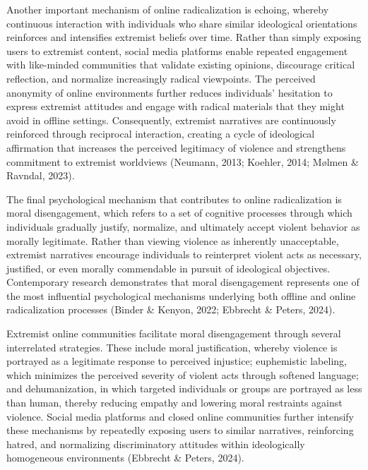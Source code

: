 \documentclass{NSP1}
\begin{document}
\par\medskip{}\smallskip

Another important mechanism of online radicalization is echoing, whereby continuous interaction with individuals who share similar ideological orientations reinforces and intensifies extremist beliefs over time. Rather than simply exposing users to extremist content, social media platforms enable repeated engagement with like-minded communities that validate existing opinions, discourage critical reflection, and normalize increasingly radical viewpoints. The perceived anonymity of online environments further reduces individuals' hesitation to express extremist attitudes and engage with radical materials that they might avoid in offline settings. Consequently, extremist narratives are continuously reinforced through reciprocal interaction, creating a cycle of ideological affirmation that increases the perceived legitimacy of violence and strengthens commitment to extremist worldviews (Neumann, 2013; Koehler, 2014; Mølmen \& Ravndal, 2023).

\par\medskip{}\smallskip

The final psychological mechanism that contributes to online radicalization is moral disengagement, which refers to a set of cognitive processes through which individuals gradually justify, normalize, and ultimately accept violent behavior as morally legitimate. Rather than viewing violence as inherently unacceptable, extremist narratives encourage individuals to reinterpret violent acts as necessary, justified, or even morally commendable in pursuit of ideological objectives. Contemporary research demonstrates that moral disengagement represents one of the most influential psychological mechanisms underlying both offline and online radicalization processes (Binder \& Kenyon, 2022; Ebbrecht \& Peters, 2024).

Extremist online communities facilitate moral disengagement through several interrelated strategies. These include moral justification, whereby violence is portrayed as a legitimate response to perceived injustice; euphemistic labeling, which minimizes the perceived severity of violent acts through softened language; and dehumanization, in which targeted individuals or groups are portrayed as less than human, thereby reducing empathy and lowering moral restraints against violence. Social media platforms and closed online communities further intensify these mechanisms by repeatedly exposing users to similar narratives, reinforcing hatred, and normalizing discriminatory attitudes within ideologically homogeneous environments (Ebbrecht \& Peters, 2024).
\end{document}
